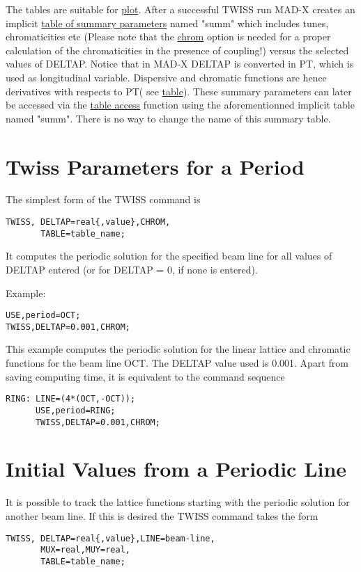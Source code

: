The tables are suitable for \href{../plot/plot.html}{plot}.   After a
successful TWISS run MAD-X creates an implicit
\href{../Introduction/tables.html#summ}{table of summary parameters}
named "summ" which includes tunes, chromaticities etc (Please note that
the \href{../Introduction/tables.html#chrom}{chrom} option is needed
for a proper calculation of the chromaticities in the presence of
coupling!) versus the selected values of DELTAP. Notice that in MAD-X
DELTAP is converted in PT, which is used as longitudinal
variable. Dispersive and chromatic functions are hence derivatives with
respects to PT( see
\href{../Introduction/tables.html#summ}{table}). These summary
parameters can later be accessed via the
\href{../Introduction/expression.html#table}{table access} function
using the aforementionned implicit table named "summ". There is no way
to change the name of this summary table.  

\section{Twiss Parameters for a Period}

The simplest form of the TWISS command is 
\begin{verbatim}
TWISS, DELTAP=real{,value},CHROM,
       TABLE=table_name;
\end{verbatim}

It computes the periodic solution for the specified beam line for all
values of DELTAP entered (or for DELTAP = 0, if none is entered).  

Example: 
\begin{verbatim}
USE,period=OCT;
TWISS,DELTAP=0.001,CHROM;
\end{verbatim}

This example computes the periodic solution for the linear lattice and
chromatic functions for the beam line OCT. The DELTAP value used is
0.001. Apart from saving computing time, it is equivalent to the command
sequence  
\begin{verbatim}
RING: LINE=(4*(OCT,-OCT));
      USE,period=RING;
      TWISS,DELTAP=0.001,CHROM;
\end{verbatim}

\section{Initial Values from a Periodic Line}

It is possible to track the lattice functions starting with the periodic
solution for another beam line. If this is desired the TWISS command
takes the form  
\begin{verbatim}
TWISS, DELTAP=real{,value},LINE=beam-line,
       MUX=real,MUY=real,
       TABLE=table_name;
\end{verbatim}

